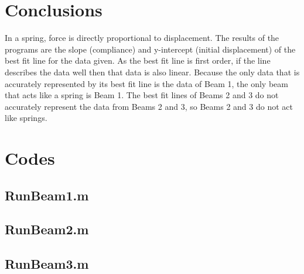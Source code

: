 \documentclass{article}
\begin{document}
\section{Conclusions}
In a spring, force is directly proportional to displacement. The results of the programs are the slope (compliance) and y-intercept (initial displacement) of the best fit line for the data given. As the best fit line is first order, if the line describes the data well then that data is also linear. Because the only data that is accurately represented by its best fit line is the data of Beam 1, the only beam that acts like a spring is Beam 1. The best fit lines of Beams 2 and 3 do not accurately represent the data from Beams 2 and 3, so Beams 2 and 3 do not act like springs.
\pagebreak

\appendix
\section{Codes}
\subsection{RunBeam1.m}
\pagebreak 
\subsection{RunBeam2.m}   
\pagebreak 
\subsection{RunBeam3.m}
\pagebreak  %
\end{document}
